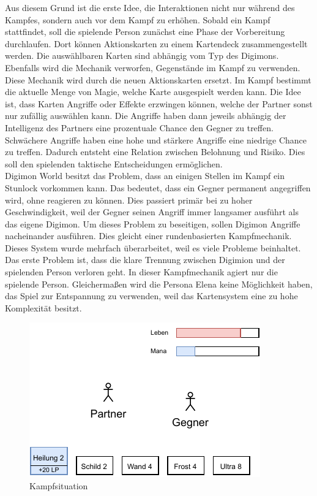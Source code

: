 Aus diesem Grund ist die erste Idee, die Interaktionen nicht nur während des Kampfes, sondern auch vor dem Kampf zu erhöhen.
Sobald ein Kampf stattfindet, soll die spielende Person zunächst eine Phase der Vorbereitung durchlaufen.
Dort können Aktionskarten zu einem Kartendeck zusammengestellt werden.
Die auswählbaren Karten sind abhängig vom Typ des Digimons.
Ebenfalls wird die Mechanik verworfen, Gegenstände im Kampf zu verwenden.
Diese Mechanik wird durch die neuen Aktionskarten ersetzt.
Im Kampf bestimmt die aktuelle Menge von Magie, welche Karte ausgespielt werden kann.
Die Idee ist, dass Karten Angriffe oder Effekte erzwingen können, welche der Partner sonst nur zufällig auswählen kann.
Die Angriffe haben dann jeweils abhängig der Intelligenz des Partners eine prozentuale Chance den Gegner zu treffen.
Schwächere Angriffe haben eine hohe und stärkere Angriffe eine niedrige Chance zu treffen.
Dadurch entsteht eine Relation zwischen Belohnung und Risiko.
Dies soll den spielenden taktische Entscheidungen ermöglichen. \\

Digimon World besitzt das Problem, dass an einigen Stellen im Kampf ein Stunlock vorkommen kann.
Das bedeutet, dass ein Gegner permanent angegriffen wird, ohne reagieren zu können.
Dies passiert primär bei zu hoher Geschwindigkeit, weil der Gegner seinen Angriff immer langsamer ausführt als das eigene Digimon.
Um dieses Problem zu beseitigen, sollen Digimon Angriffe nacheinander ausführen.
Dies gleicht einer rundenbasierten Kampfmechanik. \\

Dieses System wurde mehrfach überarbeitet, weil es viele Probleme beinhaltet.
Das erste Problem ist, dass die klare Trennung zwischen Digimion und der spielenden Person verloren geht.
In dieser Kampfmechanik agiert nur die spielende Person.
Gleichermaßen wird die Persona Elena keine Möglichkeit haben, das Spiel zur Entspannung zu verwenden, weil das Kartensystem eine zu hohe Komplexität besitzt. \\

\begin{figure}[H]
    \centering
    \includegraphics[width=0.8\columnwidth]{figures/wireframes/battle.pdf}
    \caption{\label{fig:battle-wireframe}Kampfsituation}
\end{figure}

